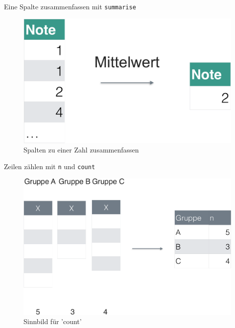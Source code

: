 \begin{frame}{Eine Spalte zusammenfassen mit \texttt{summarise}}

\begin{figure}

{\centering \includegraphics[width=0.8\linewidth]{../images/Datenjudo/summarise} 

}

\caption{Spalten zu einer Zahl zusammenfassen}\label{fig:fig-summarise}
\end{figure}

\end{frame}

\begin{frame}{Zeilen zählen mit \texttt{n} und \texttt{count}}

\begin{figure}

{\centering \includegraphics[width=0.8\linewidth]{../images/Datenjudo/count-crop} 

}

\caption{Sinnbild für 'count'}\label{fig:fig-count}
\end{figure}

\end{frame}

